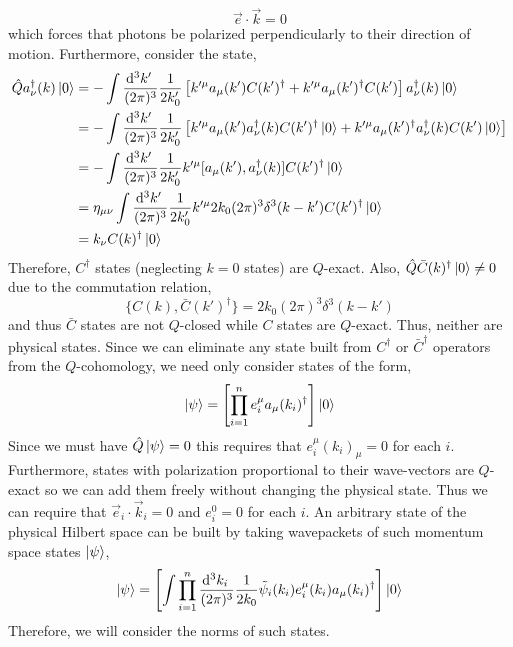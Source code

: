 \documentclass[12pt]{article}
\begin{document}
\[ \vec{e} \cdot \vec{k} = 0 \]
which forces that photons be polarized perpendicularly to their direction of motion. Furthermore, consider the state,
\begin{align*}
\hat{Q} a_\nu^\dagger(k) \left| 0 \right> & = - \int \frac{\mathrm{d}^{3} k' \:}{(2 \pi)^3} \frac{1}{2 k_0'} \left[ k'^\mu a_\mu(k') C(k')^\dagger + k'^\mu a_\mu(k')^\dagger C(k') \right] a_\nu^\dagger(k) \left| 0 \right> 
\\
& = - \int \frac{\mathrm{d}^{3} k' \:}{(2 \pi)^3} \frac{1}{2 k_0'} \left[ k'^\mu a_\mu(k')  a_\nu^\dagger(k) C(k')^\dagger \left| 0 \right>  + k'^\mu a_\mu(k')^\dagger  a_\nu^\dagger(k) C(k') \left| 0 \right>  \right] 
\\
& = - \int \frac{\mathrm{d}^{3} k' \:}{(2 \pi)^3} \frac{1}{2 k_0'} k'^\mu [a_\mu(k'),  a_\nu^\dagger(k)] C(k')^\dagger \left| 0 \right> 
\\
& =  \eta_{\mu \nu} \int \frac{\mathrm{d}^{3} k' \:}{(2 \pi)^3} \frac{1}{2 k_0'} k'^\mu 2 k_0 (2 \pi)^3 \delta^3(k - k') C(k')^\dagger \left| 0 \right>   
\\
& =  k_\nu C(k)^\dagger \left| 0 \right>  
\end{align*}
Therefore, $C^\dagger$ states (neglecting $k = 0$ states) are $Q$-exact. 
Also, $\hat{Q} \bar{C}(k)^\dagger \left| 0 \right> \neq 0$ due to the commutation relation,
\[ \{ C(k), \bar{C}(k')^\dagger \} = 2 k_0 (2\pi)^3 \delta^3(k - k') \]
and thus $\bar{C}$ states are not $Q$-closed while $C$ states are $Q$-exact. Thus, neither are physical states. Since we can eliminate any state built from $C^\dagger$ or $\bar{C}^\dagger$ operators from the $Q$-cohomology, we need only consider states of the form,
\[ \left| \psi \right> = \left[ \prod_{i = 1}^n  e^\mu_i a_\mu(k_i)^\dagger \right] \left| 0 \right> \]
Since we must have $\hat{Q} \left| \psi \right> = 0$ this requires that $e^\mu_i (k_i)_\mu = 0$ for each $i$. Furthermore, states with polarization proportional to their wave-vectors are $Q$-exact so we can add them freely without changing the physical state. Thus we can require that $\vec{e}_i \cdot \vec{k}_i = 0$ and $e^0_i = 0$ for each $i$. An arbitrary state of the physical Hilbert space can be built by taking wavepackets of such momentum space states $\left| \psi \right>$,
\[ \left| \psi \right> = \left[ \int  \prod_{i = 1}^n \frac{\mathrm{d}^{3} k_i \:}{(2 \pi)^3} \frac{1}{2 k_0}  \tilde{\psi}_i(k_i) e^\mu_i(k_i) a_\mu(k_i)^\dagger \right] \left| 0 \right> \]
Therefore, we will consider the norms of such states.
\end{document}
